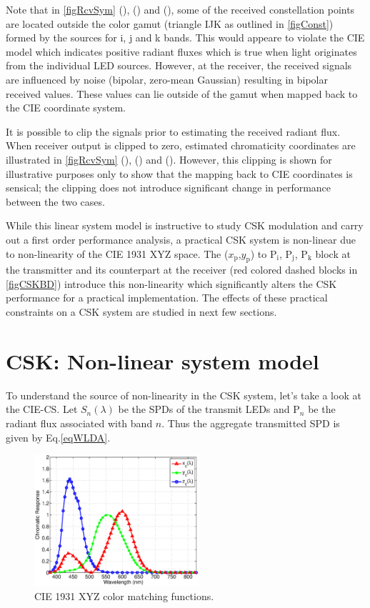 \documentclass[10pt,letterpaper]{article}
\begin{document}
Note that in \figurename\ref{figRcvSym} (),
() and (), some of the received
constellation points are located outside the color gamut (triangle IJK
as outlined in \figurename\ref{figConst}) formed by the sources for
i, j and k bands. This would appeare to violate the CIE model which
indicates positive radiant fluxes which is true when light originates
from the individual LED sources. However, at the receiver, the
received signals are influenced by noise (bipolar, zero-mean Gaussian)
resulting in bipolar received values. These values can lie outside of
the gamut when mapped back to the CIE coordinate system.

It is possible to clip the signals prior to estimating the received
radiant flux.  When receiver output is clipped to zero, estimated
chromaticity coordinates are illustrated in
\figurename\ref{figRcvSym} (),
() and (). However, this
clipping is shown for illustrative purposes only to show that the
mapping back to CIE coordinates is sensical; the clipping does not
introduce significant change in performance between the two cases.

While this linear system model is instructive to study CSK modulation
and carry out a first order performance analysis, a practical CSK
system is non-linear due to non-linearity of the CIE 1931 XYZ
space. The ($x_{\text{p}}$,$y_{\text{p}}$) to P$_{\text{i}}$, P$_{\text{j}}$, P$_{\text{k}}$ block at the
transmitter and its counterpart at the receiver (red colored dashed
blocks in \figurename\ref{figCSKBD}) introduce this non-linearity
which significantly alters the CSK performance for a practical
implementation. The effects of these practical constraints on a CSK
system are studied in next few sections.

\section{CSK: Non-linear system model}\label{sCSKNL}

To understand the source of non-linearity in the CSK system, let's take a look at the CIE-CS. Let $S_{n}(\lambda)$ be the SPDs of the transmit LEDs and P$_{n}$ be the radiant flux associated with band $n$. Thus the aggregate transmitted SPD is given by Eq.\eqref{eqWLDA}.

\begin{figure}[b]
	\centering
		\includegraphics[trim={0.05in 0.05in 0.05in 0.05in}, clip=true, width=2.4in]{CIE1931CMF.eps}
	\caption{CIE 1931 XYZ color matching functions.}
	\label{figCIEXYZ}
\end{figure}
\end{document}
